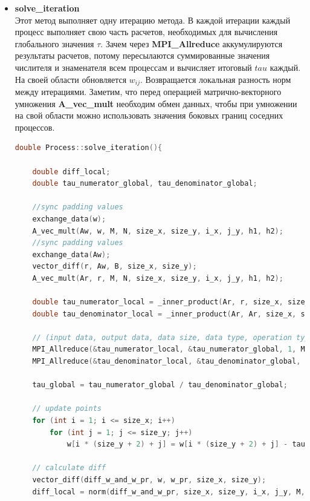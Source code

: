 \documentclass{article}
\begin{document}
\begin{itemize}
\begin{lstlisting}[language=C, caption=Process::exchange\_data()]
    ......
    ......
    \end{lstlisting}
    \item \textbf{solve\_iteration}\\
    Этот метод выполняет одну итерацию метода. В каждой итерации каждый процесс выполняет свою часть расчетов, необходимых для вычисления глобального значения $\tau$. Зачем через \textbf{MPI\_Allreduce} аккумулируются результаты расчетов, потому пересылаются суммированные значения числителя и знаменателя всем процессам и вычисляет итоговый $tau$ каждый. На своей области обновляется $w_{ij}$. Возвращается локальная разность норм между итерациями.
    Заметим, что перед операцией матрично-векторного умножения \textbf{A\_vec\_mult} необходим обмен данных, чтобы при умножении на свой области можно использовать значения боковых границ соседних процессов. 
    \begin{lstlisting}[language=C, caption=Process::solve\_iteration()]
double Process::solve_iteration(){

    double diff_local;
    double tau_numerator_global, tau_denominator_global;

    //sync padding values
    exchange_data(w);
    A_vec_mult(Aw, w, M, N, size_x, size_y, i_x, j_y, h1, h2);
    //sync padding values
    exchange_data(Aw);
    vector_diff(r, Aw, B, size_x, size_y);
    A_vec_mult(Ar, r, M, N, size_x, size_y, i_x, j_y, h1, h2);

    double tau_numerator_local = _inner_product(Ar, r, size_x, size_y, i_x, j_y, M, N, h1, h2);
    double tau_denominator_local = _inner_product(Ar, Ar, size_x, size_y, i_x, j_y, M, N, h1, h2);

    // (input data, output data, data size, data type, operation type, communicator)
    MPI_Allreduce(&tau_numerator_local, &tau_numerator_global, 1, MPI_DOUBLE, MPI_SUM, MPI_COMM_WORLD);
    MPI_Allreduce(&tau_denominator_local, &tau_denominator_global, 1, MPI_DOUBLE, MPI_SUM, MPI_COMM_WORLD);

    tau_global = tau_numerator_global / tau_denominator_global;

    // update points
    for (int i = 1; i <= size_x; i++)
        for (int j = 1; j <= size_y; j++)
            w[i * (size_y + 2) + j] = w[i * (size_y + 2) + j] - tau_global * r[i * (size_y + 2) + j];

    // calculate diff
    vector_diff(diff_w_and_w_pr, w, w_pr, size_x, size_y);
    diff_local = norm(diff_w_and_w_pr, size_x, size_y, i_x, j_y, M, N, h1, h2);


\end{lstlisting}
\end{itemize}
\end{document}
